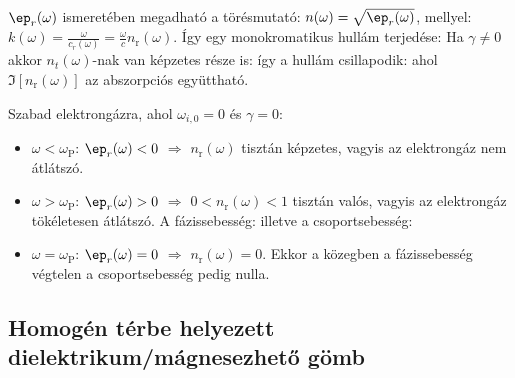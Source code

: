    $\ep_r(\omega)$ ismeretében megadható a törésmutató: $n(\omega)=\sqrt{\ep_r(\omega)}$, mellyel: $k(\omega)=\frac{\omega}{c_r(\omega)}=\frac{\omega}{c}n_\text{r}(\omega)$. Így egy monokromatikus hullám terjedése:
   Ha $\gamma\neq 0$ akkor $n_t(\omega)$-nak van képzetes része is: 
   így a hullám csillapodik:
   ahol $\Im[n_\text{r}(\omega)]$ az abszorpciós együttható. 
   
   Szabad elektrongázra, ahol $\omega_{i,0}=0$ és $\gamma=0$:
   \begin{itemize}
    \item $\omega<\omega_\text{P}$: $\ep_r(\omega)<0$ $\Rightarrow$ $n_\text{r}(\omega)$ tisztán képzetes, vagyis az elektrongáz nem átlátszó.
    \item $\omega>\omega_\text{P}$: $\ep_r(\omega)>0$ $\Rightarrow$ $0<n_\text{r}(\omega)<1$ tisztán valós, vagyis az elektrongáz tökéletesen átlátszó.
   A fázissebesség:
     illetve a csoportsebesség:
    \item $\omega=\omega_\text{P}$: $\ep_r(\omega)=0$ $\Rightarrow$ $n_\text{r}(\omega)=0$.
   Ekkor a közegben a fázissebesség végtelen a csoportsebesség pedig nulla. 
   \end{itemize}
   
  \subsection{Homogén térbe helyezett dielektrikum/mágnesezhető gömb}
   

